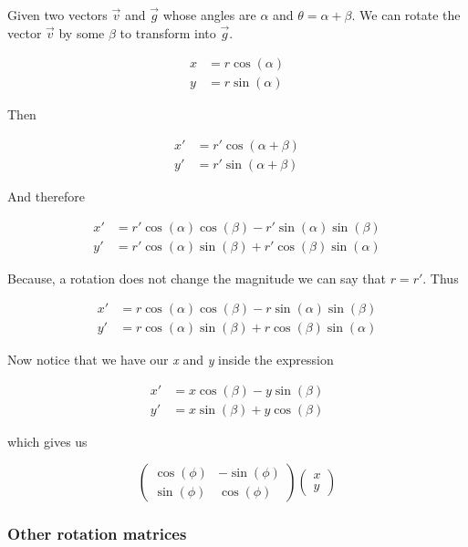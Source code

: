Given two vectors \(\vec{v}\) and \(\vec{g}\) whose angles are \(\alpha\) and \(\theta = \alpha + \beta\). 
We can rotate the vector \(\vec{v}\) by some \(\beta\) to transform into \(\vec{g}\).

\begin{align*}
    x &= r \cos(\alpha)\\
    y &= r \sin(\alpha)
\end{align*}

Then 

\begin{align*}
    x' &= r' \cos(\alpha + \beta)\\
    y' &= r' \sin(\alpha + \beta)
\end{align*}

And therefore

\begin{align*}
    x' &= r' \cos(\alpha)\cos(\beta) - r'\sin(\alpha)\sin(\beta)\\
    y' &= r' \cos(\alpha)\sin(\beta) + r'\cos(\beta)\sin(\alpha)
\end{align*}

Because, a rotation does not change the magnitude we can say that \(r = r'\). Thus 

\begin{align*}
    x' &= r \cos(\alpha)\cos(\beta) - r\sin(\alpha)\sin(\beta)\\
    y' &= r \cos(\alpha)\sin(\beta) + r\cos(\beta)\sin(\alpha)
\end{align*}

Now notice that we have our \emph{x} and \emph{y} inside the expression

\begin{align*}
    x' &= x\cos(\beta) - y\sin(\beta)\\
    y' &= x\sin(\beta) + y\cos(\beta)
\end{align*}

which gives us 

\[
    \begin{pmatrix}
        \cos(\phi) & -\sin(\phi)\\
        \sin(\phi) & \cos(\phi)
    \end{pmatrix}
    \begin{pmatrix}
        x\\
        y
    \end{pmatrix}
\]

\QED

\subsubsection{Other rotation matrices}

